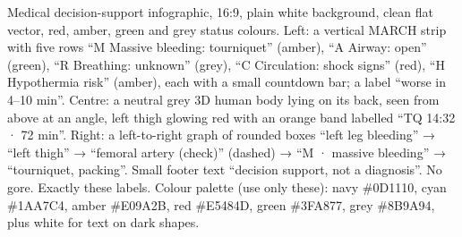 {Medical decision-support infographic, 16:9, plain white background, clean flat vector, red, amber, green and grey status
colours. Left: a vertical MARCH strip with five rows ``M Massive bleeding: tourniquet'' (amber), ``A Airway: open''
(green), ``R Breathing: unknown'' (grey), ``C Circulation: shock signs'' (red), ``H Hypothermia risk'' (amber), each
with a small countdown bar; a label ``worse in 4–10 min''. Centre: a neutral grey 3D human body lying on its back,
seen from above at an angle, left thigh glowing red with an orange band labelled ``TQ 14:32 · 72 min''. Right: a
left-to-right graph of rounded boxes ``left leg bleeding'' → ``left thigh'' → ``femoral artery (check)'' (dashed) →
``M · massive bleeding'' → ``tourniquet, packing''. Small footer text ``decision support, not a diagnosis''. No gore.
Exactly these labels. Colour palette (use only these): navy \#0D1110, cyan \#1AA7C4, amber \#E09A2B, red \#E5484D, green \#3FA877, grey \#8B9A94, plus white for text on dark shapes.}
